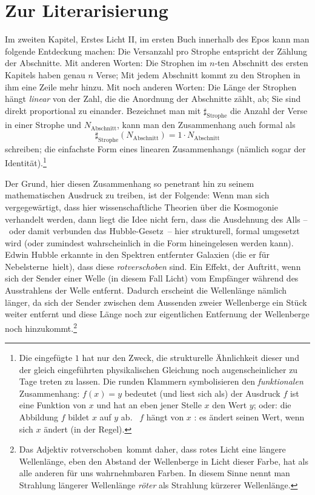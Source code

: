 \newpage
\section{Zur Literarisierung}

Im zweiten Kapitel, Erstes Licht II, im ersten Buch innerhalb des Epos kann man
  folgende Entdeckung machen:
Die Versanzahl pro Strophe entspricht der Zählung der Abschnitte.
Mit anderen Worten: Die Strophen im $n$-ten Abschnitt des ersten 
  Kapitels haben genau $n$ Verse; Mit jedem Abschnitt kommt zu den Strophen in
  ihm eine Zeile mehr hinzu.
Mit noch anderen Worten: Die Länge der Strophen hängt \emph{linear} von der
  Zahl, die die Anordnung der Abschnitte zählt, ab; Sie sind direkt
  proportional zu einander. 
Bezeichnet man mit $\sharp_{\text{Strophe}}$ die Anzahl der Verse in einer Strophe und
  $N_{\text{Abschnitt}}$, kann man den Zusammenhang auch formal als
  \begin{equation}
    \sharp_{\text{Strophe}}(N_{\text{Abschnitt}}) = 1 \cdot N_{\text{Abschnitt}}
  \end{equation}
  schreiben; die einfachste Form eines linearen Zusammenhangs (nämlich sogar
  der Identität).\footnote{Die eingefügte $1$ hat nur den Zweck, die
    strukturelle Ähnlichkeit dieser und der gleich eingeführten physikalischen
    Gleichung noch augenscheinlicher zu Tage treten zu lassen.
  Die runden Klammern symbolisieren den \emph{funktionalen} Zusammenhang: $f(x)
    = y$ bedeutet (und liest sich als) \glqq der Ausdruck $f$ ist eine Funktion
    von $x$ und hat an eben jener Stelle $x$ den Wert $y$; oder: die Abbildung $f$
    bildet $x$ auf $y$ ab. \Dhei\ $f$ hängt von $x$ \glqq: es ändert seinen
    Wert, wenn sich $x$ ändert (in der Regel).}

Der Grund, hier diesen Zusammenhang so penetrant hin zu seinem mathematischen
  Ausdruck zu treiben, ist der Folgende:
Wenn man sich vergegewärtigt, dass hier wissenschaftliche Theorien über die
  Kosmogonie verhandelt werden, dann liegt die Idee nicht fern, dass
  die Ausdehnung des Alls --~oder damit verbunden das Hubble-Gesetz~-- hier
  strukturell, formal umgesetzt wird (oder zumindest wahrscheinlich in die
  Form hineingelesen werden kann).
Edwin Hubble erkannte in den Spektren entfernter Galaxien (die er für
  \glqq Nebelsterne\grqq\ hielt), dass diese \emph{rotverschoben} sind.
Ein Effekt, der Auftritt, wenn sich der Sender einer Welle (in diesem Fall
  Licht) vom Empfänger während des Ausstrahlens der Welle entfernt.
Dadurch erscheint die Wellenlänge nämlich länger, da sich der Sender zwischen
  dem Aussenden zweier Wellenberge ein Stück weiter entfernt und diese Länge
  noch zur eigentlichen Entfernung der Wellenberge noch hinzukommt.\footnote{Das
    Adjektiv \glqq rotverschoben\grqq\ kommt daher, dass rotes Licht eine
    längere Wellenlänge, eben den Abstand der Wellenberge in Licht dieser
    Farbe, hat als alle anderen für uns wahrnehmbaren Farben.
  In diesem Sinne nennt man Strahlung längerer Wellenlänge \emph{röter} als
    Strahlung kürzerer Wellenlänge.}

